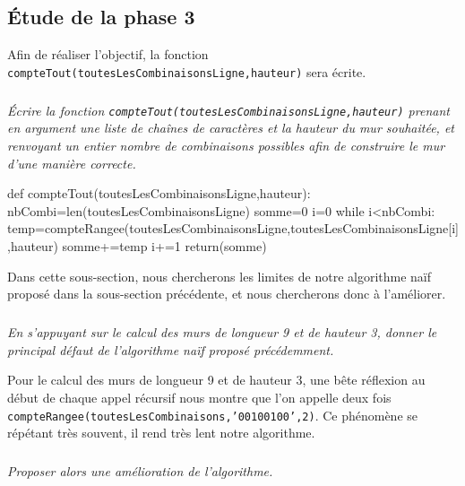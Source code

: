 \subsection*{\'Etude de la phase 3}
Afin de réaliser l'objectif, la fonction \texttt{compteTout(toutesLesCombinaisonsLigne,hauteur)} sera écrite. 


\subparagraph{}\textit{\'Ecrire la fonction \texttt{compteTout(toutesLesCombinaisonsLigne,hauteur)} prenant en argument une liste de chaînes de caractères et la hauteur du mur souhaitée, et renvoyant un entier nombre de combinaisons possibles afin de construire le mur d'une manière correcte.}
\ifprof
\begin{corrige}
def compteTout(toutesLesCombinaisonsLigne,hauteur):
    nbCombi=len(toutesLesCombinaisonsLigne)
    somme=0
    i=0
    while i<nbCombi:
        temp=compteRangee(toutesLesCombinaisonsLigne,toutesLesCombinaisonsLigne[i],hauteur)
        somme+=temp
        i+=1
    return(somme)
\end{corrige}
\else
\fi
Dans cette sous-section, nous chercherons les limites de notre algorithme naïf proposé dans la sous-section précédente, et nous chercherons donc à l'améliorer.

\subparagraph{}\textit{En s'appuyant sur le calcul des murs de longueur 9 et de hauteur 3, donner le principal défaut de l'algorithme naïf proposé précédemment.}


\ifprof
\begin{corrige}
Pour le calcul des murs de longueur 9 et de hauteur 3, une bête réflexion au début de chaque appel récursif nous montre que l'on appelle deux fois \texttt{compteRangee(toutesLesCombinaisons,'00100100',2)}. Ce phénomène se répétant très souvent, il rend très lent notre algorithme.
\end{corrige}
\else
\fi


\subparagraph{}\textit{Proposer alors une amélioration de l'algorithme.}


